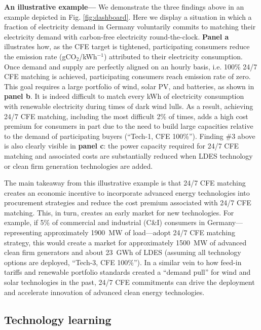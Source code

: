 \documentclass[pdflatex,sn-basic, Numbered]{sn-jnl}
\theoremstyle{thmstyleone}%
\theoremstyle{thmstyletwo}%
\theoremstyle{thmstylethree}%
\begin{document}
\textbf{An illustrative example---} We demonstrate the three findings above in an example depicted in Fig. \ref{fig:dashboard}.
Here we display a situation in which a fraction of electricity demand in Germany voluntarily commits to matching their electricity demand with carbon-free electricity round-the-clock.
\textbf{Panel a} illustrates how, as the CFE target is tightened, participating consumers reduce the emission rate (gCO$_2$/kWh$^{-1}$) attributed to their electricity consumption. Once demand and supply are perfectly aligned on an hourly basis, i.e. 100\% 24/7 CFE matching is achieved, participating consumers reach emission rate of zero. This goal requires a large portfolio of wind, solar PV, and batteries, as shown in \textbf{panel b}. It is indeed difficult to match every kWh of electricity consumption with renewable electricity during times of dark wind lulls. As a result, achieving 24/7 CFE matching, including the most difficult 2\% of times, adds a high cost premium for consumers in part due to the need to build large capacities relative to the demand of participating buyers (\enquote{Tech-1, CFE 100\%}). Finding \#3 above is also clearly visible in \textbf{panel c}: the power capacity required for 24/7 CFE matching and associated costs are substantially reduced when LDES technology or clean firm generation technologies are added.

The main takeaway from this illustrative example is that 24/7 CFE matching creates an economic incentive to incorporate advanced energy technologies into procurement strategies and reduce the cost premium associated with 24/7 CFE matching. This, in turn, creates an early market for new technologies. For example, if 5\% of commercial and industrial (C\&I) consumers in Germany---representing approximately 1900~MW of load---adopt 24/7 CFE matching strategy, this would create a market for approximately 1500~MW of advanced clean firm generators and about 23~GWh of LDES (assuming all technology options are deployed, \enquote{Tech-3, CFE 100\%}).
In a similar vein to how feed-in tariffs and renewable portfolio standards created a \enquote{demand pull} for wind and solar technologies in the past, 24/7 CFE commitments can drive the deployment and accelerate innovation of advanced clean energy technologies.

\subsection*{Technology learning}\label{sec3}
\end{document}

